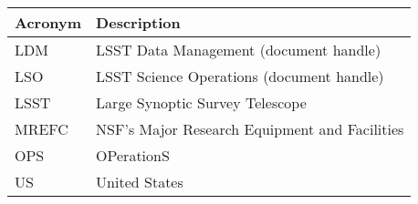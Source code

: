 \addtocounter{table}{-1}
\begin{longtable}{|l|p{}|}\hline
\textbf{Acronym} & \textbf{Description}  \\\hline

LDM & LSST Data Management (document handle) \\\hline
LSO & LSST Science Operations (document handle) \\\hline
LSST & Large Synoptic Survey Telescope \\\hline
MREFC & NSF's Major Research Equipment and Facilities \\\hline
OPS & OPerationS \\\hline
US & United States \\\hline
\end{longtable}

